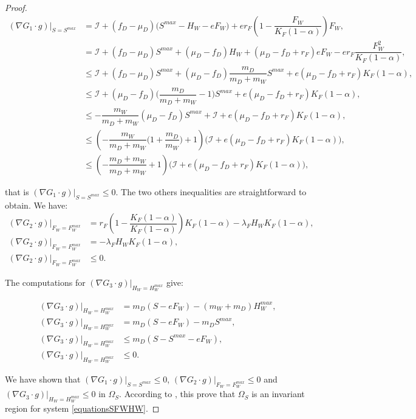 \documentclass{article}
\newcommand{\lfw}{\lambda_{F}}
\newcommand{\lfw}{\lambda_{F}}
\newcommand{\cI}{\mathcal{I}}
\begin{document}
\begin{proof}
\begin{align*}
(\nabla G_1 \cdot g)|_{S = S^{max}} &= \cI + (f_D - \mu_D) \Big(S^{max} - H_W - eF_W \Big) + e r_F \left(1 - \dfrac{F_W}{K_F(1-\alpha)} \right) F_W, \\
&= \cI + (f_D - \mu_D) S^{max} + (\mu_D - f_D) H_W + (\mu_D - f_D + r_F)eF_W - e r_F \dfrac{F_W^2}{K_F(1-\alpha)}, \\
&\leq  \cI + (f_D - \mu_D) S^{max} +(\mu_D - f_D) \dfrac{m_D}{m_D + m_W} S^{max} +e (\mu_D - f_D + r_F) K_F(1-\alpha), \\
&\leq  \cI + (\mu_D - f_D)\big(\dfrac{m_D}{m_D + m_W} - 1\Big)S^{max} +e (\mu_D - f_D + r_F) K_F(1-\alpha), \\
&\leq  - \dfrac{m_W}{m_D + m_W}(\mu_D - f_D)S^{max} +\cI +e (\mu_D - f_D + r_F) K_F(1-\alpha), \\
&\leq \left(-\dfrac{m_W}{m_D + m_W} \Big(1+ \dfrac{m_D}{m_W}\Big) + 1 \right) \Big(\cI +e (\mu_D - f_D + r_F) K_F(1-\alpha)\Big),\\
&\leq \left(-\dfrac{m_D + m_W}{m_D + m_W} + 1 \right) \Big(\cI +e (\mu_D - f_D + r_F) K_F(1-\alpha)\Big),
\end{align*}

that is $(\nabla G_1 \cdot g)|_{S = S^{max}} \leq 0$. The two others inequalities are straightforward to obtain. We have:
\begin{align*}
(\nabla G_2 \cdot g)|_{F_W = F_W^{max}} &= r_F  \left(1 - \dfrac{K_F (1-\alpha)}{K_F (1-\alpha)}\right)K_F (1-\alpha)  - \lfw H_W K_F (1-\alpha), \\
(\nabla G_2 \cdot g)|_{F_W = F_W^{max}} & = - \lfw H_W K_F (1-\alpha), \\
(\nabla G_2 \cdot g)|_{F_W = F_W^{max}} & \leq 0.
\end{align*}

The computations for $(\nabla G_3 \cdot g)|_{H_W = H_W^{max}}$ give:

\begin{align*}
(\nabla G_3 \cdot g)|_{H_W = H_W^{max}} &= m_D (S - eF_W) - (m_W + m_D) H_W^{max}, \\
(\nabla G_3 \cdot g)|_{H_W = H_W^{max}} &= m_D (S - eF_W) - m_D S^{max}, \\
(\nabla G_3 \cdot g)|_{H_W = H_W^{max}} & \leq m_D (S - S^{max} -  eF_W), \\
(\nabla G_3 \cdot g)|_{H_W = H_W^{max}} & \leq 0.
\end{align*}

We have shown that $(\nabla G_1 \cdot g)|_{S = S^{max}} \leq 0$, $(\nabla G_2 \cdot g)|_{F_W = F_W^{max}} \leq 0$ and $(\nabla G_3 \cdot g)|_{H_W = H_W^{max}} \leq 0$ in  $\Omega_S$.  According to \cite{smoller_shock_1994}, this prove that $\Omega_S$ is an invariant region for system \eqref{equationsSFWHW}.


\end{proof}
\end{document}
